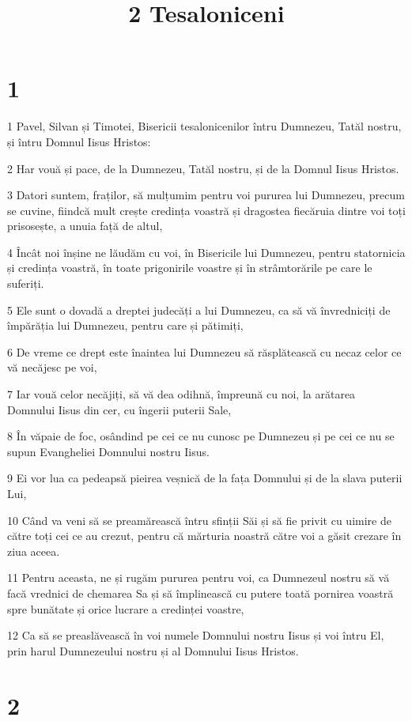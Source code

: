 

\title{2 Tesaloniceni}


\chapter{1}

\par 1 Pavel, Silvan și Timotei, Bisericii tesalonicenilor întru Dumnezeu, Tatăl nostru, și întru Domnul Iisus Hristos:
\par 2 Har vouă și pace, de la Dumnezeu, Tatăl nostru, și de la Domnul Iisus Hristos.
\par 3 Datori suntem, fraților, să mulțumim pentru voi pururea lui Dumnezeu, precum se cuvine, fiindcă mult crește credința voastră și dragostea fiecăruia dintre voi toți prisosește, a unuia față de altul,
\par 4 Încât noi înșine ne lăudăm cu voi, în Bisericile lui Dumnezeu, pentru statornicia și credința voastră, în toate prigonirile voastre și în strâmtorările pe care le suferiți.
\par 5 Ele sunt o dovadă a dreptei judecăți a lui Dumnezeu, ca să vă învredniciți de împărăția lui Dumnezeu, pentru care și pătimiți,
\par 6 De vreme ce drept este înaintea lui Dumnezeu să răsplătească cu necaz celor ce vă necăjesc pe voi,
\par 7 Iar vouă celor necăjiți, să vă dea odihnă, împreună cu noi, la arătarea Domnului Iisus din cer, cu îngerii puterii Sale,
\par 8 În văpaie de foc, osândind pe cei ce nu cunosc pe Dumnezeu și pe cei ce nu se supun Evangheliei Domnului nostru Iisus.
\par 9 Ei vor lua ca pedeapsă pieirea veșnică de la fața Domnului și de la slava puterii Lui,
\par 10 Când va veni să se preamărească întru sfinții Săi și să fie privit cu uimire de către toți cei ce au crezut, pentru că mărturia noastră către voi a găsit crezare în ziua aceea.
\par 11 Pentru aceasta, ne și rugăm pururea pentru voi, ca Dumnezeul nostru să vă facă vrednici de chemarea Sa și să împlinească cu putere toată pornirea voastră spre bunătate și orice lucrare a credinței voastre,
\par 12 Ca să se preaslăvească în voi numele Domnului nostru Iisus și voi întru El, prin harul Dumnezeului nostru și al Domnului Iisus Hristos.

\chapter{2}

